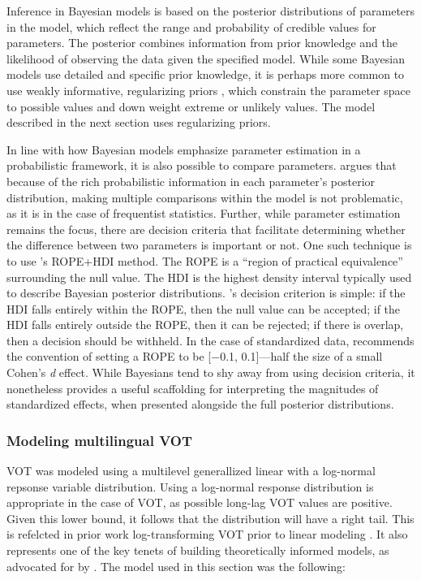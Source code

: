Inference in Bayesian models is based on the posterior distributions of parameters in the model, which reflect the range and probability of credible values for parameters. The posterior combines information from prior knowledge and the likelihood of observing the data given the specified model. While some Bayesian models use detailed and specific prior knowledge, it is perhaps more common to use weakly informative, regularizing priors \citep{gelman_2017_prior}, which constrain the parameter space to possible values and down weight extreme or unlikely values. The model described in the next section uses regularizing priors. 

In line with how Bayesian models emphasize parameter estimation in a probabilistic framework, it is also possible to compare parameters. \citet{gelman_2012_multiple} argues that because of the rich probabilistic information in each parameter's posterior distribution, making multiple comparisons within the model is not problematic, as it is in the case of frequentist statistics. Further, while parameter estimation remains the focus, there are decision criteria that facilitate determining whether the difference between two parameters is important or not. One such technique is to use \citeauthor{kruschke_2011_rope}'s \citeyearpar{kruschke_2011_rope} ROPE+HDI method. The ROPE is a ``region of practical equivalence'' surrounding the null value. The HDI is the highest density interval typically used to describe Bayesian posterior distributions. \citeauthor{kruschke_2011_rope}'s \citeyearpar{kruschke_2011_rope} decision criterion is simple: if the HDI falls entirely within the ROPE, then the null value can be accepted; if the HDI falls entirely outside the ROPE, then it can be rejected; if there is overlap, then a decision should be withheld. In the case of standardized data, \citet{kruschke_2011_rope} recommends the convention of setting a ROPE to be [$-$0.1, 0.1]---half the size of a small Cohen's \textit{d} effect. While Bayesians tend to shy away from using decision criteria, it nonetheless provides a useful scaffolding for interpreting the magnitudes of standardized effects, when presented alongside the full posterior distributions. 

\subsubsection{Modeling multilingual VOT}\label{ch4:sec:model}

VOT was modeled using a multilevel generallized linear with a log-normal repsonse variable distribution. Using a log-normal response distribution is appropriate in the case of VOT, as possible long-lag VOT values are positive. Given this lower bound, it follows that the distribution will have a right tail. This is refelcted in prior work log-transforming VOT prior to linear modeling \citep[e.g.,][]{stuartsmith_2015_private}. It also represents one of the key tenets of building theoretically informed models, as advocated for by \citet{haines_2020_theoretically}. The model used in this section was the following:

